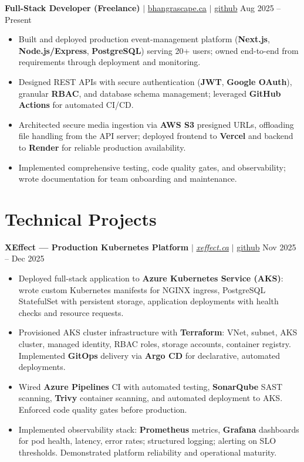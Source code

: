 \documentclass[11pt,a4paper]{article}
\begin{document}
\textbf{Full-Stack Developer (Freelance)} $|$ \href{https://bhangrascape.ca}{bhangrascape.ca} $|$ \href{https://github.com/bhat0155/bhangraescape}{\small github} \hfill Aug 2025 -- Present
\begin{itemize}
    \item Built and deployed production event-management platform (\textbf{Next.js}, \textbf{Node.js/Express}, \textbf{PostgreSQL}) serving 20+ users; owned end-to-end from requirements through deployment and monitoring.
    \item Designed REST APIs with secure authentication (\textbf{JWT}, \textbf{Google OAuth}), granular \textbf{RBAC}, and database schema management; leveraged \textbf{GitHub Actions} for automated CI/CD.
    \item Architected secure media ingestion via \textbf{AWS S3} presigned URLs, offloading file handling from the API server; deployed frontend to \textbf{Vercel} and backend to \textbf{Render} for reliable production availability.
    \item Implemented comprehensive testing, code quality gates, and observability; wrote documentation for team onboarding and maintenance.
\end{itemize}

\section{Technical Projects}

\textbf{XEffect — Production Kubernetes Platform} $|$ \href{https://www.xeffect.ca/app}{\emph{xeffect.ca}} $|$ \href{https://github.com/bhat0155/xeffect}{\small github} \hfill Nov 2025 -- Dec 2025
\begin{itemize}
    \item Deployed full-stack application to \textbf{Azure Kubernetes Service (AKS)}: wrote custom Kubernetes manifests for NGINX ingress, PostgreSQL StatefulSet with persistent storage, application deployments with health checks and resource requests.
    \item Provisioned AKS cluster infrastructure with \textbf{Terraform}: VNet, subnet, AKS cluster, managed identity, RBAC roles, storage accounts, container registry. Implemented \textbf{GitOps} delivery via \textbf{Argo CD} for declarative, automated deployments.
    \item Wired \textbf{Azure Pipelines} CI with automated testing, \textbf{SonarQube} SAST scanning, \textbf{Trivy} container scanning, and automated deployment to AKS. Enforced code quality gates before production.
    \item Implemented observability stack: \textbf{Prometheus} metrics, \textbf{Grafana} dashboards for pod health, latency, error rates; structured logging; alerting on SLO thresholds. Demonstrated platform reliability and operational maturity.
\end{itemize}
\end{document}
